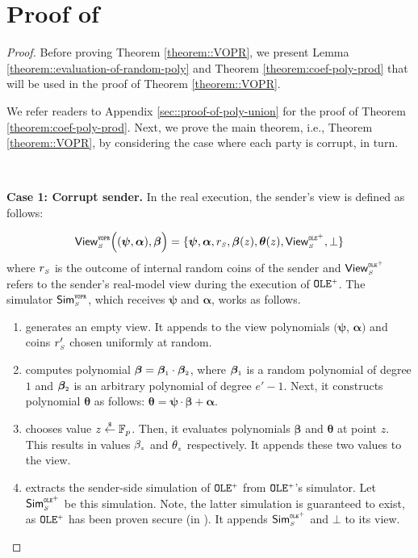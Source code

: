




\section{Proof of \vopr}\label{sec::proof-of-vopr}
\begin{proof}

Before proving Theorem \ref{theorem::VOPR}, we present Lemma \ref{theorem::evaluation-of-random-poly} and Theorem \ref{theorem:coef-poly-prod} that will be used in the proof of Theorem \ref{theorem::VOPR}. 






We refer readers to Appendix \ref{sec::proof-of-poly-union} for the proof of Theorem \ref{theorem:coef-poly-prod}. Next, we  prove the main theorem, i.e., Theorem \ref{theorem::VOPR}, by considering the case where each party is corrupt, in turn. 



\

\noindent\textbf{Case 1: Corrupt sender.} In the real execution, the sender's view is defined as follows: 


$$ \mathsf{View}_{\scriptscriptstyle S}^{\scriptscriptstyle \mathtt{VOPR}} \Big((\bm\psi, \bm{\alpha}), \bm\beta\Big)=\{\bm\psi, \bm{\alpha}, r_{\scriptscriptstyle S},  \bm\beta(z), \bm\theta(z), \mathsf{View}^{\scriptscriptstyle \mathtt{OLE}^{\scriptscriptstyle +}}_{\scriptscriptstyle S}, \bot \}$$
%
where $r_{\scriptscriptstyle S}$ is the outcome of internal random coins of the sender and $\mathsf{View}^{\scriptscriptstyle \mathtt{OLE}^{\scriptscriptstyle +}}_{\scriptscriptstyle S}$ refers to the sender's real-model view during the execution of  $\mathtt{OLE}^{\scriptscriptstyle +}$. The simulator $\mathsf{Sim}^{\scriptscriptstyle \mathtt{VOPR}}_{\scriptscriptstyle S}$, which receives $\bm\psi$ and $\bm \alpha$, works as follows. 
%
\begin{enumerate}
\item generates an empty view. It appends to the view polynomials $(\bm\psi$, $\bm{\alpha})$ and coins $r'_{\scriptscriptstyle S}$ chosen uniformly at random. 
%
\item computes polynomial $\bm\beta=\bm\beta_{\scriptscriptstyle 1} \cdot \bm\beta_{\scriptscriptstyle 2}$, where $\bm\beta_{\scriptscriptstyle 1}$ is a random polynomial of degree $1$ and $\bm\beta_{\scriptscriptstyle 2}$ is an arbitrary polynomial of degree $e'-1$. Next,  it constructs polynomial $\bm\theta$ as follows: $\bm\theta=\bm\psi\cdot \bm\beta+\bm \alpha$.

\item chooses value $z\stackrel{\scriptscriptstyle\$}\leftarrow \mathbb{F}_{p}$. Then, it evaluates polynomials $\bm\beta$ and $\bm\theta$  at point $z$. This results in values $\beta_{\scriptscriptstyle z}$ and $\theta_{\scriptscriptstyle z}$ respectively. It appends these two values to the view. 
\item extracts the sender-side simulation of $\mathtt{OLE}^{\scriptscriptstyle +}$ from  $\mathtt{OLE}^{\scriptscriptstyle +}$'s simulator. Let $\mathsf{Sim}^{\scriptscriptstyle \mathtt{OLE}^{\scriptscriptstyle +}}_{\scriptscriptstyle S}$ be this simulation. Note, the latter simulation is guaranteed to exist, as $\mathtt{OLE}^{\scriptscriptstyle +}$ has been proven secure (in \cite{GhoshN19}). It appends $\mathsf{Sim}^{\scriptscriptstyle \mathtt{OLE}^{\scriptscriptstyle +}}_{\scriptscriptstyle S}$ and $\bot$ to its view. 
\end{enumerate}


\end{proof}
